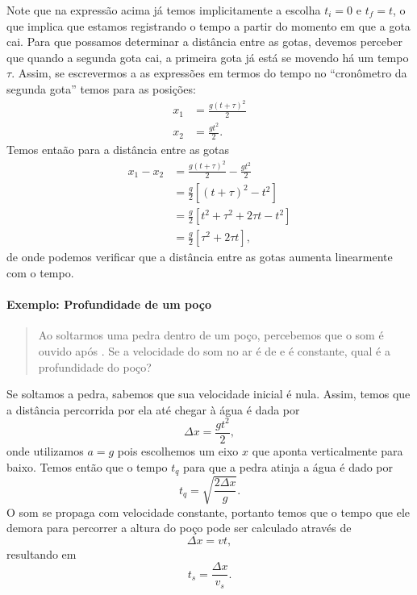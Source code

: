 Note que na expressão acima já temos implicitamente a escolha $t_i = 0$ e $t_f = t$, o que implica que estamos registrando o tempo a partir do momento em que a gota cai. Para que possamos determinar a distância entre as gotas, devemos perceber que quando a segunda gota cai, a primeira gota já está se movendo há um tempo $\tau$. Assim, se escrevermos a as expressões em termos do tempo no ``cronômetro da segunda gota'' temos para as posições:
\begin{align}
	x_1 &= \frac{g(t + \tau)^2}{2} \\
	x_2 &= \frac{gt^2}{2}.
\end{align}
%
Temos entaão para a distância entre as gotas
\begin{align}
	x_1 - x_2 &= \frac{g(t + \tau)^2}{2} - \frac{gt^2}{2}\\
			  &= \frac{g}{2} \left[(t + \tau)^2 - t^2\right] \\
			  &= \frac{g}{2} \left[t^2 + \tau^2 + 2\tau t - t^2\right] \\
			  &= \frac{g}{2} [\tau^2 + 2\tau t],
\end{align}
%
de onde podemos verificar que a distância entre as gotas aumenta linearmente com o tempo.

\paragraph{Exemplo: Profundidade de um poço}

\begin{quote}
Ao soltarmos uma pedra dentro de um poço, percebemos que o som é ouvido após . Se a velocidade do som no ar é de  e é constante, qual é a profundidade do poço?
\end{quote}

Se soltamos a pedra, sabemos que sua velocidade inicial é nula. Assim, temos que a distância percorrida por ela até chegar à água é dada por
\begin{equation}
	\Delta x = \frac{gt^2}{2},
\end{equation}
%
onde utilizamos $a = g$ pois escolhemos um eixo $x$ que aponta verticalmente para baixo. Temos então que o tempo $t_q$ para que a pedra atinja a água é dado por
\begin{equation}
	t_q = \sqrt{\frac{2 \Delta x}{g}}.
\end{equation}
%
O som se propaga com velocidade constante, portanto temos que o tempo que ele demora para percorrer a altura do poço pode ser calculado através de 
\begin{equation}
	\Delta x = v t,
\end{equation}
%
resultando em
\begin{equation}
	t_s = \frac{\Delta x}{v_s}.
\end{equation}

